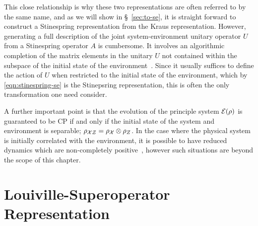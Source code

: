 This close relationship is why these two representations are often referred to by the same name, and as we will show in \S~\ref{sec:to-se}, it is straight forward to construct a Stinespring representation from the Kraus representation. However, generating a full description of the joint system-environment unitary operator $U$ from a Stinespring operator $A$ is cumbersome. It involves an algorithmic completion of the matrix elements in the unitary $U$ not contained within the subspace of the initial state of the environment~\cite{Bengtsson2006}. Since it usually suffices to define the action of $U$ when restricted to the initial state of the environment, which by \eqref{eqn:stinespring-se} is the Stinepsring representation, this is often the only transformation one need consider.

\begin{remark}
A further important point is that the evolution of the principle system ${\cal E}(\rho)$ is guaranteed to be CP if and only if the initial state of the system and environment is separable; $\rho_{{\cal X}{\cal Z}}=\rho_{{\cal X}}\otimes\rho_{{\sl Z}}$. In the case where the physical system is initially correlated with the environment, it is possible to have reduced dynamics which are non-completely positive~\cite{Weinstein2004,Carteret2008}, however such situations are beyond the scope of this chapter.  
\end{remark}

\section{Louiville-Superoperator Representation}
\label{sec:sop}

